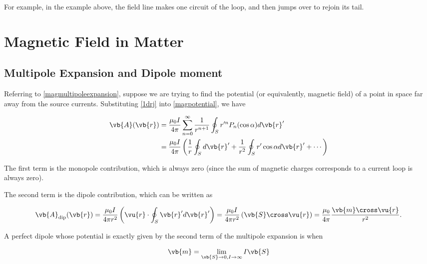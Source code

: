 \documentclass[english,a4paper,12pt]{report}
\begin{document}
For example, in the example above, the field line makes one circuit of the loop, and then jumps over to rejoin its tail. 
\chapter{Magnetic Field in Matter}

\section{Multipole Expansion and Dipole moment}

Referring to \cref{magmultipoleexpansion}, suppose we are trying to find the potential (or equivalently, magnetic field) of a point in space far away from the source currents. Substituting \cref{1drj} into \cref{magpotential}, we have 


\begin{equation}
    \begin{aligned} 
    \vb{A} (\vb{r} ) &= \frac{\mu_0I}{4\pi}  \sum_{n=0}^{\infty} \frac{1}{r^{n+1} } \oint_{S} r'^{n} P_{n}(\cos \alpha )d\vb{r} ' \\
    &= \frac{\mu_0I}{4\pi}  \left( \frac{1}{r} \oint_{S}  d\vb{r}' + \frac{1}{r^2}\oint_{S}  r'\cos \alpha d\vb{r}' + \cdots  \right) 
    \end{aligned} 
\end{equation}

The first term is the monopole contribution, which is always zero (since the sum of magnetic charges corresponds to a current loop is always zero).

The second term is the dipole contribution, which can be written as 

\begin{equation}
    \vb{A} _{\text{dip} } (\vb{r} ) = \frac{\mu_0I}{4\pi r^2}  \left( \vu{r}  \cdot \oint_{S} \vb{r} ' d\vb{r}'  \right) = \frac{\mu_0I}{4\pi r^2} \left( \vb{S} \cross \vu{r} \right) = \frac{\mu_0}{4\pi} \frac{\vb{m} \cross  \vu{r} }{r^2 }.    \label{magdippotential} 
\end{equation}

A perfect dipole whose potential is exactly given by the second term of the multipole expansion is when 

\begin{equation}
    \vb{m} = \lim_{\vb{S}  \to 0, I \to \infty} I\vb{S}  
\end{equation}
\end{document}
